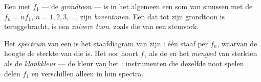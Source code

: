 \begin{definition}[Boventonen]\label{def:g12:sound-acoustics:harmonics}
Een   met  $f_1$ --- de
\emph{grondtoon} --- is in het algemeen een som van
sinussen met de  $f_n = n f_1$, $n = 1, 2, 3, \dots$, zijn
\emph{boventonen}. Een  dat tot zijn grondtoon is
teruggebracht, is een \emph{zuivere toon}, zoals die
van een stemvork.
\end{definition}

\begin{definition}\label{def:g12:sound-acoustics:timbre}
Het \emph{spectrum} van een  is het staafdiagram van
zijn : één staaf per $f_n$, waarvan de hoogte de sterkte van die
 is. Het oor hoort $f_1$ als de  en het \emph{mengsel}
van sterkten als de \emph{klankkleur} --- de kleur van
het : instrumenten die dezelfde noot spelen delen $f_1$ en
verschillen alleen in hun spectra.
\end{definition}

